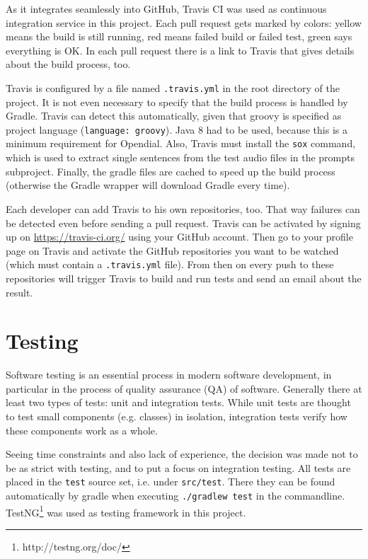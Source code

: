 \documentclass[a4paper, 12pt]{article}
\begin{document}
As it integrates seamlessly into GitHub, Travis CI was used as continuous integration service in this project.
Each pull request gets marked by colors: yellow means the build is still running, red means failed build or failed test, green says everything is OK.
In each pull request there is a link to Travis that gives details about the build process, too.

Travis is configured by a file named \texttt{.travis.yml} in the root directory of the project.
It is not even necessary to specify that the build process is handled by Gradle.
Travis can detect this automatically, given that groovy is specified as project language (\texttt{language: groovy}).
Java 8 had to be used, because this is a minimum requirement for Opendial.
Also, Travis must install the \texttt{sox} command, which is used to extract single sentences from the test audio files in the prompts subproject.
Finally, the gradle files are cached to speed up the build process (otherwise the Gradle wrapper will download Gradle every time).

Each developer can add Travis to his own repositories, too.
That way failures can be detected even before sending a pull request.
Travis can be activated by signing up on \url{https://travis-ci.org/} using your GitHub account.
Then go to your profile page on Travis and activate the GitHub repositories you want to be watched (which must contain a \texttt{.travis.yml} file).
From then on every push to these repositories will trigger Travis to build and run tests and send an email about the result.

\newpage
\section{Testing}
\label{sec:Testing}
Software testing is an essential process in modern software development, in particular in the process of quality assurance (QA) of software.
Generally there at least two types of tests: unit and integration tests.
While unit tests are thought to test small components (e.g. classes) in isolation, integration tests verify how these components work as a whole.

Seeing time constraints and also lack of experience, the decision was made not to be as strict with testing, and to put a focus on integration testing.
All tests are placed in the \texttt{test} source set, i.e. under \texttt{src/test}.
There they can be found automatically by gradle when executing \texttt{./gradlew test} in the commandline.
TestNG\footnote{http://testng.org/doc/} was used as testing framework in this project.
\end{document}
